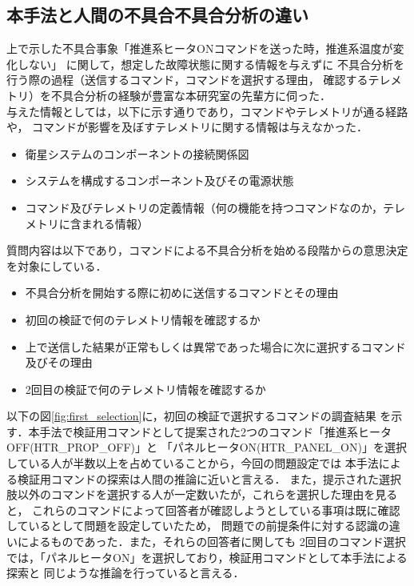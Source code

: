 \documentclass[11pt]{jsreport}
\begin{document}

\subsection{本手法と人間の不具合不具合分析の違い}
上で示した不具合事象「推進系ヒータONコマンドを送った時，推進系温度が変化しない」
に関して，想定した故障状態に関する情報を与えずに
不具合分析を行う際の過程（送信するコマンド，コマンドを選択する理由，
確認するテレメトリ）を不具合分析の経験が豊富な本研究室の先輩方に伺った．\\
与えた情報としては，以下に示す通りであり，コマンドやテレメトリが通る経路や，
コマンドが影響を及ぼすテレメトリに関する情報は与えなかった．
\begin{itemize}
   \item 衛星システムのコンポーネントの接続関係図
   \item システムを構成するコンポーネント及びその電源状態
   \item コマンド及びテレメトリの定義情報（何の機能を持つコマンドなのか，テレメトリに含まれる情報）
\end{itemize}
質問内容は以下であり，コマンドによる不具合分析を始める段階からの意思決定を対象にしている．
\begin{itemize}
   \item 不具合分析を開始する際に初めに送信するコマンドとその理由
   \item 初回の検証で何のテレメトリ情報を確認するか
   \item 上で送信した結果が正常もしくは異常であった場合に次に選択するコマンド及びその理由
   \item 2回目の検証で何のテレメトリ情報を確認するか
\end{itemize}
以下の図\ref{fig:first_selection}に，初回の検証で選択するコマンドの調査結果
を示す．本手法で検証用コマンドとして提案された2つのコマンド「推進系ヒータOFF(HTR\_PROP\_OFF)」と
「パネルヒータON(HTR\_PANEL\_ON)」を選択している人が半数以上を占めていることから，今回の問題設定では
本手法による検証用コマンドの探索は人間の推論に近いと言える．
また，提示された選択肢以外のコマンドを選択する人が一定数いたが，これらを選択した理由を見ると，
これらのコマンドによって回答者が確認しようとしている事項は既に確認しているとして問題を設定していたため，
問題での前提条件に対する認識の違いによるものであった．また，それらの回答者に関しても
2回目のコマンド選択では，「パネルヒータON」を選択しており，検証用コマンドとして本手法による探索と
同じような推論を行っていると言える．
\end{document}
